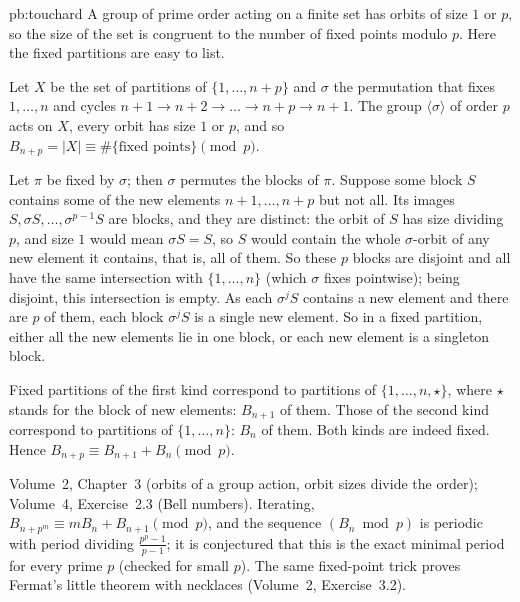 \begin{solution}{pb:touchard}
\idea A group of prime order acting on a finite set has orbits of size $1$ or $p$, so the size of the set is congruent to the
number of fixed points modulo $p$. Here the fixed partitions are easy to list.

\writeup Let $X$ be the set of partitions of $\{1,\dots,n+p\}$ and $\sigma$ the permutation that fixes $1,\dots,n$ and cycles
$n+1\to n+2\to\dots\to n+p\to n+1$. The group $\langle\sigma\rangle$ of order $p$ acts on $X$, every orbit has size $1$ or $p$, and so
$B_{n+p}=|X|\equiv\#\{\text{fixed points}\}\pmod p$.

Let $\pi$ be fixed by $\sigma$; then $\sigma$ permutes the blocks of $\pi$. Suppose some block $S$ contains some of the new elements
$n+1,\dots,n+p$ but not all. Its images $S,\sigma S,\dots,\sigma^{p-1}S$ are blocks, and they are distinct: the orbit of $S$ has size
dividing $p$, and size $1$ would mean $\sigma S=S$, so $S$ would contain the whole $\sigma$-orbit of any new element it contains,
that is, all of them. So these $p$ blocks are disjoint and all have the same intersection with $\{1,\dots,n\}$ (which $\sigma$ fixes
pointwise); being disjoint, this intersection is empty. As each $\sigma^jS$ contains a new element and there are $p$ of them,
each block $\sigma^jS$ is a single new element. So in a fixed partition, either all the new elements lie in one block, or each
new element is a singleton block.

Fixed partitions of the first kind correspond to partitions of $\{1,\dots,n,\star\}$, where $\star$ stands for the block of new
elements: $B_{n+1}$ of them. Those of the second kind correspond to partitions of $\{1,\dots,n\}$: $B_n$ of them. Both kinds are
indeed fixed. Hence $B_{n+p}\equiv B_{n+1}+B_n\pmod p$.

\tools Volume~2, Chapter~3 (orbits of a group action, orbit sizes divide the order); Volume~4, Exercise~2.3 (Bell numbers).
\leads Iterating, $B_{n+p^m}\equiv mB_n+B_{n+1}\pmod p$, and the sequence $(B_n\bmod p)$ is periodic with period dividing
$\frac{p^p-1}{p-1}$; it is conjectured that this is the exact minimal period for every prime $p$ (checked for small $p$). The same
fixed-point trick proves Fermat's little theorem with necklaces (Volume~2, Exercise~3.2).
\end{solution}

